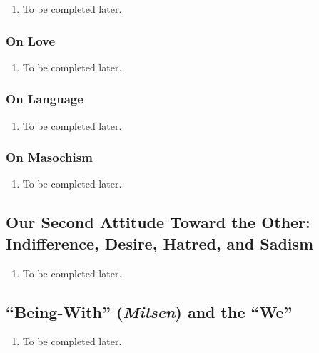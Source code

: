\begin{enumerate}
  \item To be completed later.
\end{enumerate}

\subsubsection{On Love}

\begin{enumerate}
  \item To be completed later.
\end{enumerate}

\subsubsection{On Language}

\begin{enumerate}
  \item To be completed later.
\end{enumerate}

\subsubsection{On Masochism}

\begin{enumerate}
  \item To be completed later.
\end{enumerate}

\subsection{Our Second Attitude Toward the Other: Indifference, Desire, Hatred, and Sadism}

\begin{enumerate}
  \item To be completed later.
\end{enumerate}

\subsection{\enquote{Being-With} (\emph{Mitsen}) and the \enquote{We}}

\begin{enumerate}
  \item To be completed later.
\end{enumerate}
